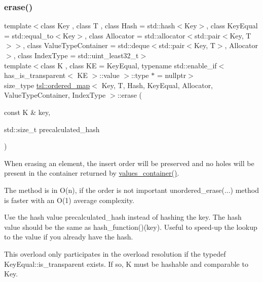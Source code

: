 \subsubsection{\texorpdfstring{erase()}{erase()}\hspace{0.1cm}{\footnotesize\ttfamily [7/7]}}
{\footnotesize\ttfamily template$<$class Key , class T , class Hash  = std\+::hash$<$\+Key$>$, class Key\+Equal  = std\+::equal\+\_\+to$<$\+Key$>$, class Allocator  = std\+::allocator$<$std\+::pair$<$\+Key, T$>$$>$, class Value\+Type\+Container  = std\+::deque$<$std\+::pair$<$\+Key, T$>$, Allocator$>$, class Index\+Type  = std\+::uint\+\_\+least32\+\_\+t$>$ \\
template$<$class K , class KE  = Key\+Equal, typename std\+::enable\+\_\+if$<$ has\+\_\+is\+\_\+transparent$<$ K\+E $>$\+::value $>$\+::type $\ast$  = nullptr$>$ \\
size\+\_\+type \mbox{\hyperlink{classtsl_1_1ordered__map}{tsl\+::ordered\+\_\+map}}$<$ Key, T, Hash, Key\+Equal, Allocator, Value\+Type\+Container, Index\+Type $>$\+::erase (\begin{DoxyParamCaption}\item[{const K \&}]{key,  }\item[{std\+::size\+\_\+t}]{precalculated\+\_\+hash }\end{DoxyParamCaption})\hspace{0.3cm}{\ttfamily [inline]}}





When erasing an element, the insert order will be preserved and no holes will be present in the container returned by \textquotesingle{}\mbox{\hyperlink{classtsl_1_1ordered__map_abb69bca0a80def48ae806078d77175cb}{values\+\_\+container()}}\textquotesingle{}.

The method is in O(n), if the order is not important \textquotesingle{}unordered\+\_\+erase(...)\textquotesingle{} method is faster with an O(1) average complexity.

Use the hash value \textquotesingle{}precalculated\+\_\+hash\textquotesingle{} instead of hashing the key. The hash value should be the same as hash\+\_\+function()(key). Useful to speed-\/up the lookup to the value if you already have the hash.

This overload only participates in the overload resolution if the typedef Key\+Equal\+::is\+\_\+transparent exists. If so, K must be hashable and comparable to Key. \mbox{\label{classtsl_1_1ordered__map_acf83c071d5e48bd5322ce39fcd2e2359}} 
